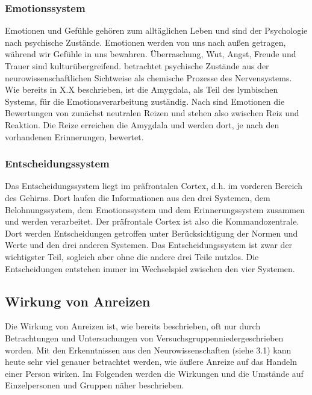 \subsubsection{Emotionssystem}

Emotionen und Gefühle gehören zum alltäglichen Leben und sind der Psychologie nach  psychische Zustände. Emotionen werden von uns nach außen getragen, während wir Gefühle in uns bewahren. Überraschung, Wut, Angst, Freude und Trauer sind kulturübergreifend. \citep[S. 67]{Nowka.2013}
\citet[S. 17]{Seelbach.2011} betrachtet psychische Zustände aus der neurowissenschaftlichen Sichtweise als chemische Prozesse des Nervensystems. Wie bereits in X.X beschrieben, ist die Amygdala, als Teil des lymbischen Systems, für die Emotionsverarbeitung zuständig. 
Nach \citet[S. 18]{Seelbach.2011} sind Emotionen die Bewertungen von zunächst neutralen Reizen und stehen also zwischen Reiz und Reaktion. Die Reize erreichen die Amygdala und werden dort, je nach den vorhandenen Erinnerungen, bewertet.

\subsubsection{Entscheidungssystem}
Das Entscheidungssystem liegt im präfrontalen Cortex, d.h. im vorderen Bereich des Gehirns. Dort laufen die Informationen aus den drei Systemen, dem Belohnungssystem, dem Emotionssystem und dem Erinnerungssystem zusammen und werden verarbeitet. Der präfrontale Cortex ist also die Kommandozentrale. Dort werden Entscheidungen getroffen unter Berücksichtigung der Normen und Werte und den drei anderen Systemen. Das Entscheidungssystem ist zwar der wichtigster Teil, sogleich aber ohne die andere drei Teile nutzlos. Die Entscheidungen entstehen immer im Wechselspiel zwischen den vier Systemen. \citep[S. 19]{Seelbach.2011}

\subsection{Wirkung von Anreizen}
Die Wirkung von Anreizen ist, wie bereits beschrieben, oft nur durch Betrachtungen und Untersuchungen von \glqq Versuchsgruppen\grqq niedergeschrieben worden. Mit den Erkenntnissen aus den Neurowissenschaften (siehe 3.1) kann heute sehr viel genauer betrachtet werden, wie äußere Anreize auf das Handeln einer Person wirken. Im Folgenden werden die Wirkungen und die Umstände auf Einzelpersonen und Gruppen näher beschrieben.

